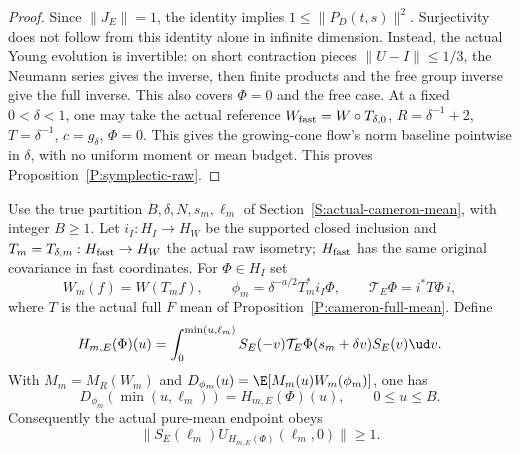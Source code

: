 \begin{proof}
  Since $\|J_E\|=1$, the identity implies $1\le\|P_D(t,s)\|^2$.
  Surjectivity does not follow from this identity alone in infinite
  dimension. Instead, the actual Young evolution is invertible:
  on short contraction pieces $\|U-I\|\le1/3$, the Neumann
  series gives the inverse, then finite products and the free
  group inverse give the full inverse.
  This also covers $\Phi=0$ and the free case.
  At a fixed $0<\delta<1$, one may take the actual reference
  $W_{\rm fast}=W\circ T_{\delta,0}$, $R=\delta^{-1}+2$,
  $T=\delta^{-1}$, $c=g_\delta$, $\Phi=0$.
  This gives the growing-cone flow's norm baseline pointwise in
  $\delta$, with no uniform moment or mean budget.
  This proves Proposition~\ref{P:symplectic-raw}.
\end{proof}

\begin{proposition}\label{P:symplectic-block-mean}
  Use the true partition $B,\delta,N,s_m,\ell_m$ of
  Section~\ref{S:actual-cameron-mean}, with integer $B\ge1$.
  Let $i_I:H_I\to H_W$ be the supported closed inclusion and
  $T_m=T_{\delta,m}:H_{\rm fast}\to H_W$ the actual raw isometry;
  $H_{\rm fast}$ has the same original covariance in fast coordinates.
  For $\Phi\in H_I$ set
  \[
    W_m(f)=W(T_mf),\qquad
    \phi_m=\delta^{-a/2}T_m^*i_I\Phi,\qquad
    \mathcal T_E\Phi=i^*T\Phi\,i ,
  \]
  where $T$ is the actual full $F$ mean of
  Proposition~\ref{P:cameron-full-mean}.
  Define
  \begin{equation}\label{E:symplectic-block-primitive}
    H_{m,E}(\Phi)(u)=\int_0^{\min(u,\ell_m)}
    S_E(-v)\mathcal T_E\Phi(s_m+\delta v)S_E(v)\ud v .
  \end{equation}
  With $M_m=M_R(W_m)$ and
  $D_{\phi_m}(u)=\E[M_m(u)W_m(\phi_m)]$, one has
  \begin{equation}\label{E:symplectic-block-direction}
    D_{\phi_m}(\min(u,\ell_m))=H_{m,E}(\Phi)(u),\qquad 0\le u\le B .
  \end{equation}
  Consequently the actual pure-mean endpoint obeys
  \[
    \|S_E(\ell_m)U_{H_{m,E}(\Phi)}(\ell_m,0)\|\ge1 .
  \]
\end{proposition}

